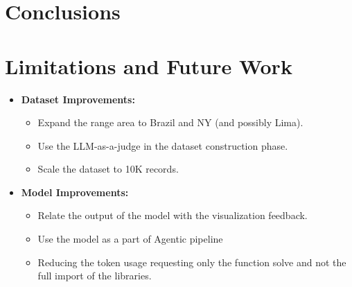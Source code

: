 
\section{Conclusions}

\section{Limitations and Future Work}

\begin{itemize}
    \item \textbf{Dataset Improvements:} 
    \begin{itemize}
        \item Expand the range area to Brazil and NY (and possibly Lima). 
        \item Use the LLM-as-a-judge in the dataset construction phase.
        \item Scale the dataset to 10K records.
    \end{itemize}
    \item \textbf{Model Improvements:}
    \begin{itemize}
        \item Relate the output of the model with the visualization feedback.
        \item Use the model as a part of Agentic pipeline
        \item Reducing the token usage requesting only the function solve and not the full import of the libraries.
    \end{itemize}
\end{itemize}
